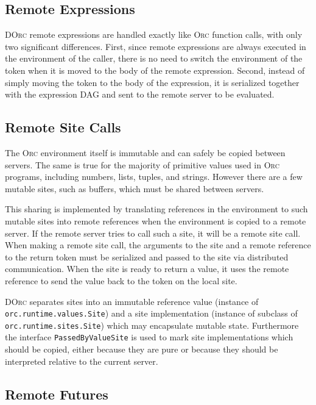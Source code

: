 \documentclass[10pt,letterpaper]{article}
\begin{document}
\subsection{Remote Expressions}

\textsc{DOrc} remote expressions are handled exactly like \textsc{Orc} function
calls, with only two significant differences. First, since remote expressions
are always executed in the environment of the caller, there is no need to
switch the environment of the token when it is moved to the body of the remote
expression. Second, instead of simply moving the token to the body of the
expression, it is serialized together with the expression DAG and sent to the
remote server to be evaluated.

\subsection{Remote Site Calls}

The \textsc{Orc} environment itself is immutable and can safely be copied
between servers. The same is true for the majority of primitive values used in
\textsc{Orc} programs, including numbers, lists, tuples, and strings. However
there are a few mutable sites, such as buffers, which must be shared between
servers.

This sharing is implemented by translating references in the environment to
such mutable sites into remote references when the environment is copied to a
remote server. If the remote server tries to call such a site, it will be a
remote site call. When making a remote site call, the arguments to the site and
a remote reference to the return token must be serialized and passed to the
site via distributed communication.  When the site is ready to return a value,
it uses the remote reference to send the value back to the token on the local
site.

\textsc{DOrc} separates sites into an immutable reference value
(instance of {\tt orc.run\-time.values.Site}) and a site implementation (instance
of subclass of {\tt orc.run\-time.sites.Site}) which may encapsulate mutable
state.  Furthermore the interface \texttt{Passed\-By\-Value\-Site} is used to
mark site implementations which should be copied, either because they are pure
or because they should be interpreted relative to the current server.

\subsection{Remote Futures}
\end{document}
